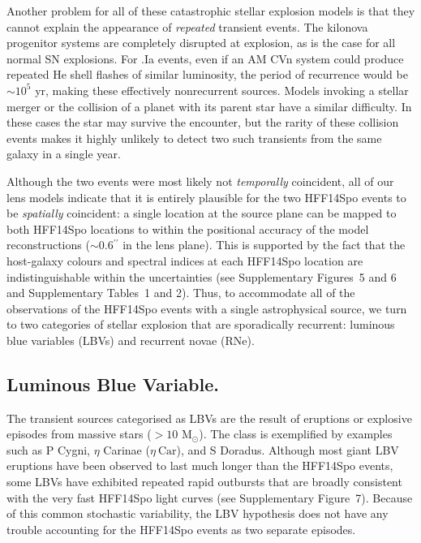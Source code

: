 \documentclass{article}
\def\arcsec{\ensuremath{^{\prime\prime}}\xspace}
\def\Msun{\mbox{M$_{\odot}$}\xspace}
\def\etaCar{\ensuremath{\eta~\mbox{Car}}\xspace}
\def\spock{HFF14Spo\xspace}
\begin{document}
Another problem for all of these catastrophic stellar explosion models
is that they cannot explain the appearance of {\it repeated} transient
events.  The kilonova progenitor systems are completely disrupted at
explosion, as is the case for all normal SN explosions.  For .Ia
events, even if an AM CVn system could produce repeated He shell
flashes of similar luminosity, the period of recurrence would be
$\sim10^5$ yr, making these effectively nonrecurrent sources.  Models
invoking a stellar merger or the collision of a planet with its parent
star have a similar difficulty.  In these cases the star may survive
the encounter, but the rarity of these collision events makes it
highly unlikely to detect two such transients from the same galaxy in
a single year.

Although the two events were most likely not {\it temporally}
coincident, all of our lens models indicate that it is entirely
plausible for the two \spock events to be {\it spatially} coincident:
a single location at the source plane can be mapped to both \spock
locations to within the positional accuracy of the model
reconstructions ($\sim0.6$\arcsec in the lens plane). This is
supported by the fact that the host-galaxy colours and spectral indices
at each \spock location are indistinguishable within the uncertainties
(see Supplementary Figures~5 and 6 and Supplementary
Tables~1 and 2).  Thus, to accommodate all of the
observations of the \spock events with a single astrophysical source,
we turn to two categories of stellar explosion that are sporadically
recurrent: luminous blue variables (LBVs) and recurrent novae (RNe).

\subsection{Luminous Blue Variable.}

The transient sources categorised as LBVs are the result of eruptions
or explosive episodes from massive stars ($>10$ \Msun). The class is
exemplified by examples such as P Cygni, $\eta$ Carinae (\etaCar), and
S Doradus\cite{Smith:2011b, Kochanek:2012}.  Although most giant LBV
eruptions have been observed to last much longer than the \spock
events\cite{Smith:2011b}, some LBVs have exhibited repeated rapid
outbursts that are broadly consistent with the very fast \spock light
curves (see Supplementary Figure~7). Because of this common
stochastic variability, the LBV hypothesis does not have any trouble
accounting for the \spock events as two separate episodes.
\end{document}
